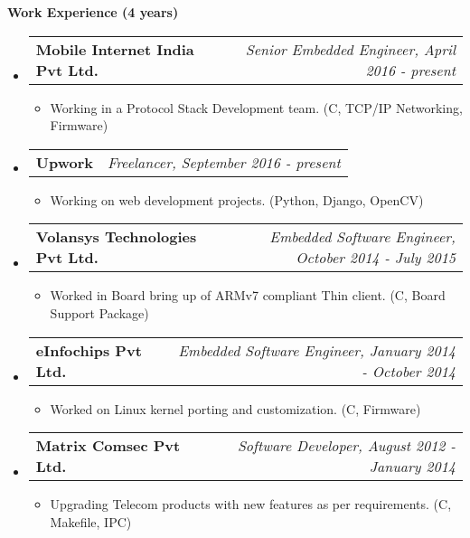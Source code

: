 \documentclass[letterpaper,10pt]{article}
\makeatletter
\newcommand{\resitem}[1]{\item #1 \vspace{-2pt}}
\newcommand{\resheading}[1]{{\large \colorbox{mygrey}{\begin{minipage}{\textwidth}{\textbf{#1 \vphantom{p\^{E}}}}\end{minipage}}}}
\newcommand{\ressubheading}[4]{
\begin{tabular*}{7.0in}{l@{\extracolsep{\fill}}r}
		\textbf{#1} & \textit{#4} \\
\end{tabular*}\vspace{-6pt}}
\makeatother
\begin{document}
\resheading{Work Experience (4 years)}
\begin{itemize}

\item
	\ressubheading{Mobile Internet India Pvt Ltd.}{Ahmedabad, India}{}{Senior Embedded Engineer, April 2016 - present}
	\begin{itemize}
		\resitem{Working in a Protocol Stack Development team.}(C, TCP/IP Networking, Firmware)
	\end{itemize}

\item
	\ressubheading{Upwork}{Remote}{}{Freelancer, September 2016 - present}
	\begin{itemize}
		\resitem{Working on web development projects.}(Python, Django, OpenCV)
	\end{itemize}

\item
	\ressubheading{Volansys Technologies Pvt Ltd.}{Ahmedabad, India}{}{Embedded Software Engineer, October 2014 - July 2015}
	\begin{itemize}
		\resitem{Worked in Board bring up of ARMv7 compliant Thin client.}(C, Board Support Package)
	\end{itemize}

\item
	\ressubheading{eInfochips Pvt Ltd.}{Ahmedabad, India}{}{Embedded Software Engineer, January 2014 - October 2014}
	\begin{itemize}
		\resitem{Worked on Linux kernel porting and customization.}(C, Firmware)
	\end{itemize}

\item
	\ressubheading{Matrix Comsec Pvt Ltd.}{Ahmedabad, India}{}{Software Developer, August 2012 - January 2014}
	\begin{itemize}
		\resitem{Upgrading Telecom products with new features as per requirements.}(C, Makefile, IPC)
	\end{itemize}

\end{itemize}
\end{document}
